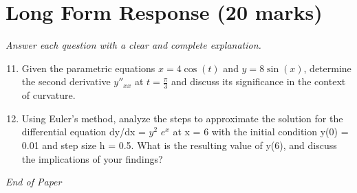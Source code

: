 \documentclass[12pt]{article}
\begin{document}
\section*{Long Form Response (20 marks)}
\textit{Answer each question with a clear and complete explanation.}
\begin{enumerate}[label=\arabic*.]
\setcounter{enumi}{10}
\item Given the parametric equations \( x = 4 \cos(t) \) and \( y = 8 \sin(x) \), determine the second derivative \( y''_{xx} \) at \( t = \frac{\pi}{3} \) and discuss its significance in the context of curvature.
\item Using Euler's method, analyze the steps to approximate the solution for the differential equation dy/dx = $y^2$ $e^x$ at x = 6 with the initial condition y(0) = 0.01 and step size h = 0.5. What is the resulting value of y(6), and discuss the implications of your findings?
\end{enumerate}

\vfill
\noindent\textit{End of Paper}
\end{document}

